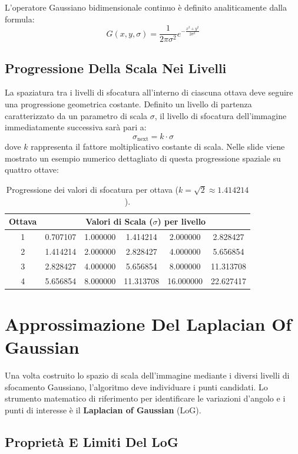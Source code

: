 ﻿\documentclass[11pt, a4paper]{article}
\begin{document}
L'operatore Gaussiano bidimensionale continuo è definito analiticamente dalla formula:
\[ \boxed{G(x, y, \sigma) = \frac{1}{2\pi\sigma^2} e^{-\frac{x^2+y^2}{2\sigma^2}}} \]

\subsection{Progressione Della Scala Nei Livelli}

La spaziatura tra i livelli di sfocatura all'interno di ciascuna ottava deve seguire una progressione geometrica costante. Definito un livello di partenza caratterizzato da un parametro di scala $\sigma$, il livello di sfocatura dell'immagine immediatamente successiva sarà pari a:
\[ \sigma_{\text{next}} = k \cdot \sigma \]
dove $k$ rappresenta il fattore moltiplicativo costante di scala. Nelle slide viene mostrato un esempio numerico dettagliato di questa progressione spaziale su quattro ottave:

\begin{table}[H]
\centering
\begin{tabular}{cccccc}
\toprule
\textbf{Ottava} & \multicolumn{5}{c}{\textbf{Valori di Scala ($\sigma$) per livello}} \\
\midrule
1 & 0.707107 & 1.000000 & 1.414214 & 2.000000 & 2.828427 \\
2 & 1.414214 & 2.000000 & 2.828427 & 4.000000 & 5.656854 \\
3 & 2.828427 & 4.000000 & 5.656854 & 8.000000 & 11.313708 \\
4 & 5.656854 & 8.000000 & 11.313708 & 16.000000 & 22.627417 \\
\bottomrule
\end{tabular}
\caption{Progressione dei valori di sfocatura per ottava ($k = \sqrt{2} \approx 1.414214$).}
\end{table}

\newpage

\section{Approssimazione Del Laplacian Of Gaussian}

Una volta costruito lo spazio di scala dell'immagine mediante i diversi livelli di sfocamento Gaussiano, l'algoritmo deve individuare i punti candidati. Lo strumento matematico di riferimento per identificare le variazioni d'angolo e i punti di interesse è il \textbf{Laplacian of Gaussian} (LoG).

\subsection{Proprietà E Limiti Del LoG}
\end{document}
